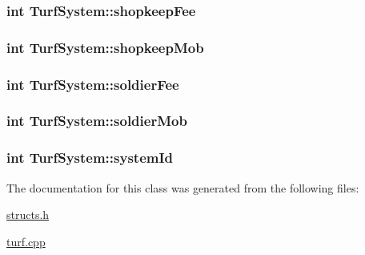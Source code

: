 \hypertarget{classTurfSystem_a07d7f9ef716c90576e025f2aa723a34d}{
\subsubsection[{shopkeep\-Fee}]{\setlength{\rightskip}{0pt plus 5cm}int Turf\-System\-::shopkeep\-Fee}}\label{classTurfSystem_a07d7f9ef716c90576e025f2aa723a34d}
\hypertarget{classTurfSystem_abcafdb36f781eb1e8e67e8e3543a7e3e}{
\subsubsection[{shopkeep\-Mob}]{\setlength{\rightskip}{0pt plus 5cm}int Turf\-System\-::shopkeep\-Mob}}\label{classTurfSystem_abcafdb36f781eb1e8e67e8e3543a7e3e}
\hypertarget{classTurfSystem_ab6ce40d3de05363ce523dea3e60e021d}{
\subsubsection[{soldier\-Fee}]{\setlength{\rightskip}{0pt plus 5cm}int Turf\-System\-::soldier\-Fee}}\label{classTurfSystem_ab6ce40d3de05363ce523dea3e60e021d}
\hypertarget{classTurfSystem_a033e759d856e32306f5331b5dd418c5c}{
\subsubsection[{soldier\-Mob}]{\setlength{\rightskip}{0pt plus 5cm}int Turf\-System\-::soldier\-Mob}}\label{classTurfSystem_a033e759d856e32306f5331b5dd418c5c}
\hypertarget{classTurfSystem_aa5746034cee0ced8cba900b27e0ec09a}{
\subsubsection[{system\-Id}]{\setlength{\rightskip}{0pt plus 5cm}int Turf\-System\-::system\-Id}}\label{classTurfSystem_aa5746034cee0ced8cba900b27e0ec09a}


The documentation for this class was generated from the following files\-:\begin{DoxyCompactItemize}
\item 
\hyperlink{structs_8h}{structs.\-h}\item 
\hyperlink{turf_8cpp}{turf.\-cpp}\end{DoxyCompactItemize}
